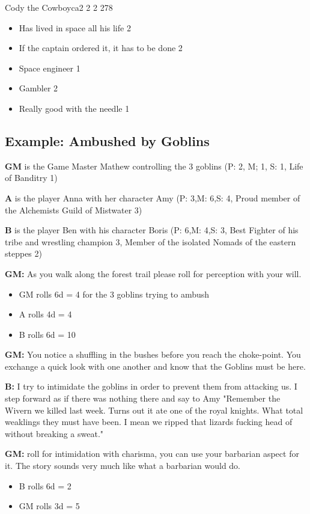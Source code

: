 \documentclass[11pt]{article}
\begin{document}
{\begin{npc}{Cody the Cowboy}{ca}{2 2 2 2}{78}
\begin{itemize}
\item Has lived in space all his life 2
\item If the captain ordered it, it has to be done 2
\item Space engineer 1
\item Gambler 2
\item Really good with the needle 1
\end{itemize}
\end{npc}


\subsection{Example: Ambushed by Goblins}
\label{sec:orgabb0fc1}

\textbf{GM} is the Game Master Mathew controlling the 3 goblins (P: 2, M; 1, S: 1, Life of Banditry 1)

\textbf{A} is the player Anna with her character Amy (P: 3,M: 6,S: 4, Proud member of the Alchemists Guild of Mistwater 3)

\textbf{B} is the player Ben with his character Boris (P: 6,M: 4,S: 3, Best Fighter of his tribe and wrestling champion 3, Member of the isolated Nomads of the eastern steppes 2)

\textbf{GM:} As you walk along the forest trail please roll for perception with your will.
\begin{itemize}
\item GM rolls 6d = 4 for the 3 goblins trying to ambush
\item A rolls 4d =  4
\item B rolls 6d = 10
\end{itemize}

\textbf{GM:} You notice a shuffling in the bushes before you reach the choke-point. You exchange a quick look with one another and know that the Goblins must be here. 

\textbf{B:} I try to intimidate the goblins in order to prevent them from attacking us. I step forward as if there was nothing there and say to Amy "Remember the Wivern we killed last week. Turns out it ate one of the royal knights. What total weaklings they must have been. I mean we ripped that lizards fucking head of without breaking a sweat."

\textbf{GM:} roll for intimidation with charisma, you can use your barbarian aspect for it. The story sounds very much like what a barbarian would do.
\begin{itemize}
\item B rolls 6d = 2
\item GM rolls 3d = 5
\end{itemize}

}
\end{document}
